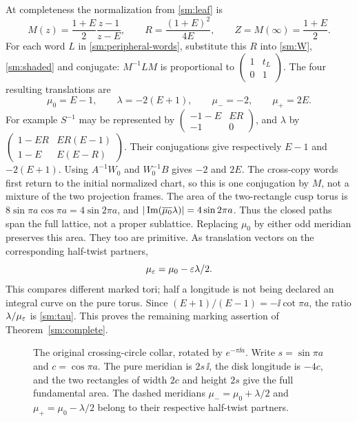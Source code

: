 At completeness the normalization from \eqref{sm:leaf} is
\[
 M(z)=\frac{1+E}{2}\frac{z-1}{z-E},
 \qquad
 R=\frac{(1+E)^2}{4E},\qquad Z=M(\infty)=\frac{1+E}{2}.
\]
For each word $L$ in \eqref{sm:peripheral-words}, substitute this
$R$ into \eqref{sm:W}, \eqref{sm:shaded} and conjugate:
$M^{-1}LM$ is proportional to
$\left(\begin{smallmatrix}1&t_L\\0&1\end{smallmatrix}\right)$.
The four resulting translations are
\begin{equation}\label{sm:translations}
 \mu_0=E-1,\qquad \lambda=-2(E+1),\qquad
 \mu_-=-2,\qquad \mu_+=2E.
\end{equation}
For example $S^{-1}$ may be represented by
$\left(\begin{smallmatrix}-1-E&ER\\-1&0\end{smallmatrix}\right)$,
and $\lambda$ by
$\left(\begin{smallmatrix}1-ER&ER(E-1)\\1-E&E(E-R)\end{smallmatrix}\right)$.
Their conjugations give respectively $E-1$ and $-2(E+1)$.
Using $A^{-1}W_0$ and $W_0^{-1}B$ gives $-2$ and $2E$.
The cross-copy words first return to the initial normalized
chart, so this is one conjugation by $M$, not a mixture of the
two projection frames.
The area of the two-rectangle cusp torus is $8\sin\pi a\cos\pi a=4\sin2\pi a$,
and
$|\operatorname{Im}(\overline{\mu_0}\lambda)|=4\sin2\pi a$.
Thus the closed paths span the full lattice, not a proper sublattice.
Replacing $\mu_0$ by either odd meridian preserves this area.
They too are primitive. As translation vectors on the corresponding
half-twist partners,
\[
                   \mu_\varepsilon=\mu_0-\varepsilon\lambda/2.
\]
This compares different marked tori; half a longitude is not being
declared an integral curve on the pure torus.
Since $(E+1)/(E-1)=-\ii\cot\pi a$, the ratio
$\lambda/\mu_\varepsilon$ is \eqref{sm:tau}.
This proves the remaining marking assertion of
Theorem~\ref{sm:complete}.

\begin{figure}[ht]
\centering
\caption{The original crossing-circle collar, rotated by
$e^{-\pi\ii a}$. Write $s=\sin\pi a$ and $c=\cos\pi a$.
The pure meridian is $2s\,\ii$, the disk longitude is $-4c$,
and the two rectangles of width $2c$ and height $2s$ give the
full fundamental area. The dashed meridians
$\mu_-=\mu_0+\lambda/2$ and $\mu_+=\mu_0-\lambda/2$ belong
to their respective half-twist partners.}
\label{sm:collar-figure}
\end{figure}

